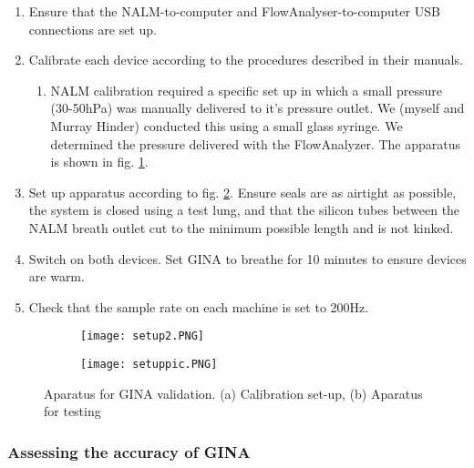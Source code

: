 \documentclass[12pt, openany, oneside]{book}
\begin{document}
\begin{enumerate}
\item Ensure that the NALM-to-computer and FlowAnalyser-to-computer USB connections are set up.
\item Calibrate each device according to the procedures described in their manuals.
	\begin{enumerate}
		\item NALM calibration required a specific set up in which a small pressure (30-50hPa) was manually delivered to it's pressure outlet. We (myself and Murray Hinder) conducted this using a small glass syringe. We determined the pressure delivered with the FlowAnalyzer. The apparatus is shown in fig. \ref{fig:cali}.
	\end{enumerate}
\item Set up apparatus according to fig. \ref{fig:aparatus}. Ensure seals are as airtight as possible, the system is closed using a test lung, and that the silicon tubes between the NALM breath outlet cut to the minimum possible length and is not kinked.
\item Switch on both devices. Set GINA to breathe for 10 minutes to ensure devices are warm.
\item Check that the sample rate on each machine is set to 200Hz.
\end{enumerate}

\begin{figure}

		
	\begin{subfigure}{.99\textwidth}	
		\texttt{[image: setup2.PNG]}		
		\caption{}
		\label{fig:cali}
	\end{subfigure}
	
	\begin{subfigure}{.99\textwidth}
		\texttt{[image: setuppic.PNG]}		
		\caption{}
		\label{fig:aparatus}
	\end{subfigure}
	
	\caption[Aparatus for GINA validation]{Aparatus for GINA validation. (a) Calibration set-up, (b) Aparatus for testing} 
\label{fig:calib}
	
	
\end{figure}

\subsubsection{Assessing the accuracy of GINA}
\end{document}
